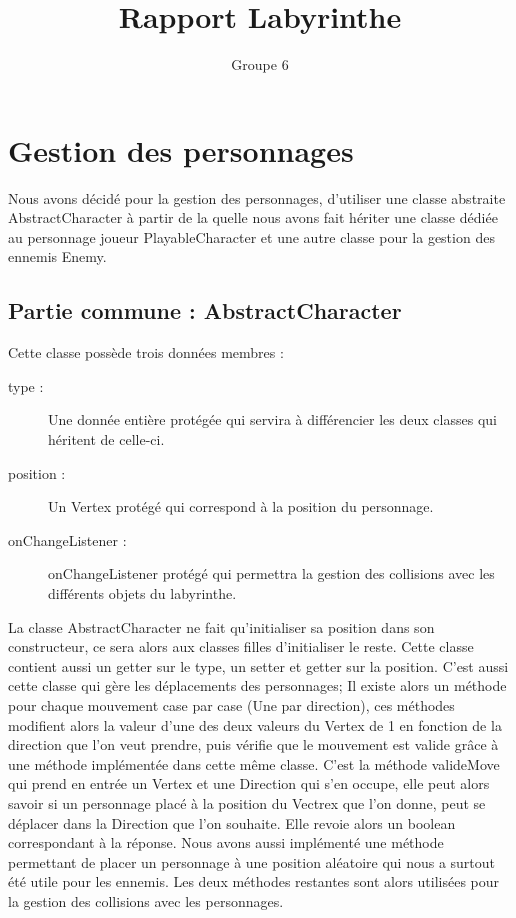 \documentclass [10pt, a4paper]{article}
\title {Rapport Labyrinthe}
\author {Groupe 6}
\begin{document}
\maketitle
\newpage

\tableofcontents
\newpage

\section {Gestion des personnages}
Nous avons décidé pour la gestion des personnages, d'utiliser une classe abstraite AbstractCharacter à partir de la quelle nous avons fait hériter une classe dédiée au personnage joueur PlayableCharacter et une autre classe pour la gestion des ennemis Enemy.

\subsection {Partie commune : AbstractCharacter}
Cette classe possède trois données membres :
\begin {description}
\item  [type :]             Une donnée entière protégée qui servira à différencier les deux classes qui héritent de celle-ci.
\item  [position :]         Un Vertex protégé qui correspond à la position du personnage.
\item  [onChangeListener :] onChangeListener protégé qui permettra la gestion des collisions avec les différents objets du labyrinthe.
\end   {description} 

La classe AbstractCharacter ne fait qu'initialiser sa position dans son constructeur, ce sera alors aux classes filles d'initialiser le reste. Cette classe contient aussi un getter sur le type, un setter et getter sur la position. C'est aussi cette classe qui gère les déplacements des personnages; Il existe alors un méthode pour chaque mouvement case par case (Une par direction), ces méthodes modifient alors la valeur d'une des deux valeurs du Vertex de 1 en fonction de la direction que l'on veut prendre, puis vérifie que le mouvement est valide grâce à une méthode implémentée dans cette même classe. C'est la méthode valideMove qui prend en entrée un Vertex et une Direction qui s'en occupe, elle peut alors savoir si un personnage placé à la position du Vectrex que l'on donne, peut se déplacer dans la Direction que l'on souhaite. Elle revoie alors un boolean correspondant à la réponse. Nous avons aussi implémenté une méthode permettant de placer un personnage à une position aléatoire qui nous a surtout été utile pour les ennemis. Les deux méthodes restantes sont alors utilisées pour la gestion des collisions avec les personnages.
\end{document}
